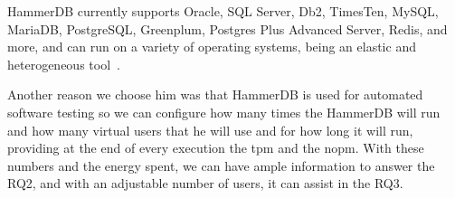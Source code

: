 HammerDB currently supports Oracle, SQL Server, Db2, TimesTen, MySQL, MariaDB, PostgreSQL, Greenplum, Postgres Plus Advanced Server, Redis, and more, and can run on a variety of operating systems, being an elastic and heterogeneous tool~\cite{benchmarkchen}.

Another reason we choose him was that HammerDB is used for automated software testing \cite{hammerdb} so we can configure how many times the HammerDB will run and how many virtual users that he will use and for how long it will run, providing at the end of every execution the \gls{tpm} and the \gls{nopm}. With these numbers and the energy spent, we can have ample information to answer the RQ2, and with an adjustable number of users, it can assist in the RQ3.

